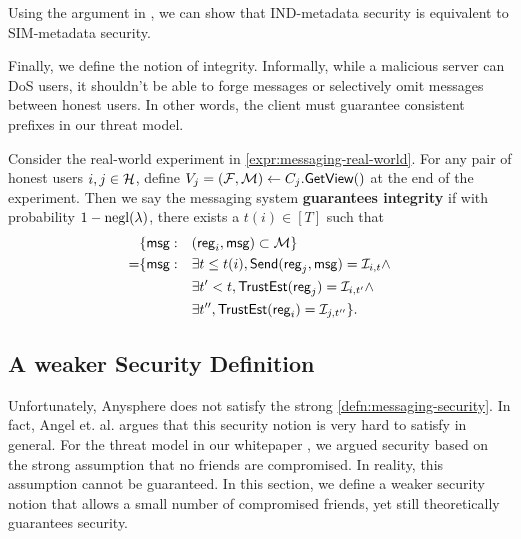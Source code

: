 Using the argument in \cite[Appendix A]{shi2021non}, we can show that IND-metadata security is equivalent to SIM-metadata security.

Finally, we define the notion of integrity. Informally, while a malicious server can DoS users, it shouldn't be able to forge messages  or selectively omit messages between honest users. In other words, the client must guarantee consistent prefixes in our threat model.
\begin{definition}
\label{defn:messaging-integrity}
Consider the real-world experiment in \cref{expr:messaging-real-world}. For any pair of honest users $i, j \in \mathcal{H}$, define $V_j = (\mathcal{F}, \mathcal{M}) \leftarrow C_j.\mathsf{GetView}()$ at the end of the experiment. Then we say the messaging system \textbf{guarantees integrity} if with probability $1 - \operatorname{negl}(\lambda)$, there exists a $t(i) \in [T]$ such that
\begin{align*}
     &\{\mathsf{msg}: &&(\mathsf{reg}_i, \mathsf{msg}) \subset \mathcal{M}\} \\
      =& \{\mathsf{msg}: &&\exists t \leq t(i), \mathsf{Send}(\mathsf{reg}_j, \mathsf{msg}) = \mathcal{I}_{i, t} \land \\
          &   &&\exists t' < t, \mathsf{TrustEst}(\mathsf{reg}_j) = \mathcal{I}_{i, t'} \land \\
          &   &&\exists t'', \mathsf{TrustEst}(\mathsf{reg}_i) = \mathcal{I}_{j, t''}\}.
\end{align*}
\end{definition}

\subsection{A weaker Security Definition}
\label{subsec:messaging-security-weaker}
Unfortunately, Anysphere does not satisfy the strong \cref{defn:messaging-security}. In fact, Angel et. al. \cite{angel2018cf} argues that this security notion is very hard to satisfy in general. For the threat model in our whitepaper \cite{whitepaper}, we argued security based on the strong assumption that no friends are compromised. In reality, this assumption cannot be guaranteed. In this section, we define a weaker security notion that allows a small number of compromised friends, yet still theoretically guarantees security.



